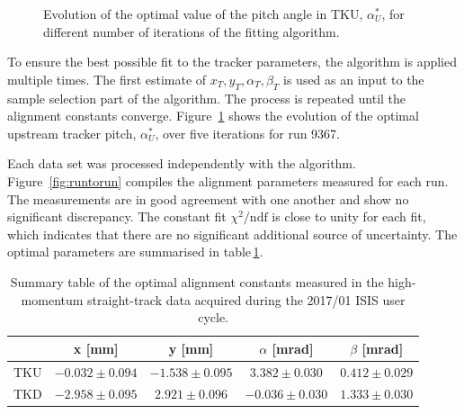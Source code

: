 \begin{figure} [!htb]
\begin{minipage}[b]{.48\textwidth}
		\caption{Evolution of the optimal value of the pitch angle in TKU, $\alpha_U^*$, for different number of iterations of the fitting algorithm.}
		\label{fig:optalpha}
	\end{minipage}
\end{figure}

To ensure the best possible fit to the tracker parameters, the algorithm is applied multiple times. The first estimate of $x_T,y_T,\alpha_T,\beta_T$ is used as an input to the sample selection part of the algorithm. The process is repeated until the alignment constants converge. Figure~\ref{fig:optalpha} shows the evolution of the optimal upstream tracker pitch, $\alpha_U^
*$, over five iterations for run 9367.

Each data set was processed independently with the algorithm. Figure~\ref{fig:runtorun} compiles the alignment parameters measured for each run. The measurements are in good agreement with one another and show no significant discrepancy. The constant fit $\chi^2/\text{ndf}$ is close to unity for each fit, which indicates that there are no significant additional source of uncertainty. The optimal parameters are summarised in table\,\ref{tab:201701_constants}.

\begin{table}[h!]
	\centering
		\begin{tabular}{l|c|c|c|c}
			& x [mm] & y [mm] & $\alpha$ [mrad] & $\beta$ [mrad] \\
			\hline
			TKU & $-0.032\pm0.094$ & $-1.538\pm0.095$ & $ 3.382\pm0.030$ & $0.412\pm0.029$ \\
			TKD & $-2.958\pm0.095$ & $ 2.921\pm0.096$ & $-0.036\pm0.030$ & $1.333\pm0.030$
		\end{tabular}
	\caption{Summary table of the optimal alignment constants measured in the high-momentum straight-track data acquired during the 2017/01 ISIS user cycle.}
	\label{tab:201701_constants}
\end{table}

